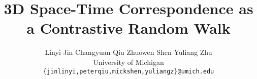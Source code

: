 \documentclass[final]{cvpr}
\begin{document}
\title{3D Space-Time Correspondence as a Contrastive Random Walk}


\author{
Linyi Jin \kern15pt Changyuan Qiu \kern15pt Zhuowen Shen \kern15pt Yuliang Zhu \\
   University of Michigan\\
	{\tt\small \{jinlinyi,peterqiu,mickshen,yuliangz\}@umich.edu}\\
}



\maketitle


\end{document}

